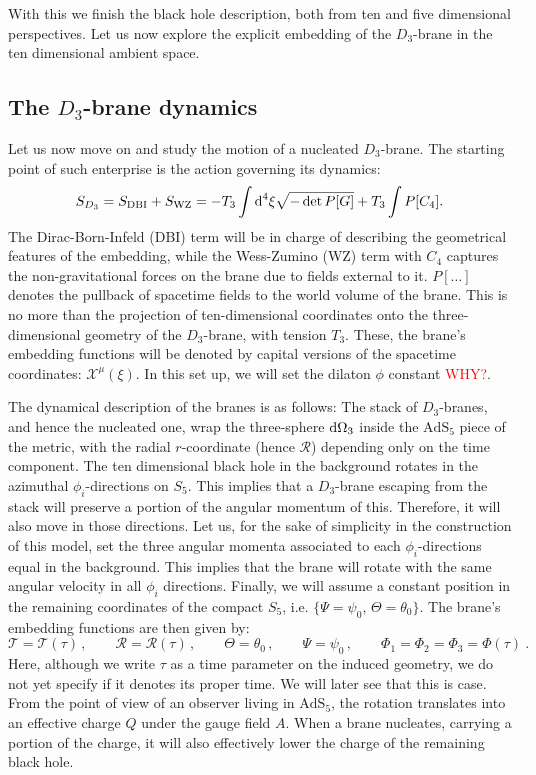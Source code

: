With this we finish the black hole description, both from ten and five dimensional perspectives. Let us now explore the explicit embedding of the $D_{3}$-brane in the ten dimensional ambient space.

\subsection{The $D_{3}$-brane dynamics}
Let us now move on and study the motion of a nucleated $D_{3}$-brane. The starting point of such enterprise is the action governing its dynamics:
\begin{equation}\label{eq: D3_action}
  S_{D_{3}} = S_{\text{DBI}} +S_{\text{WZ}} =  -T_3\int \text{d}^4\xi \sqrt{-\det P[G]}+T_3\int P[C_4].
\end{equation}
The Dirac-Born-Infeld (DBI) term will be in charge of describing the geometrical features of the embedding, while the Wess-Zumino (WZ) term with $C_4$ captures the non-gravitational forces on the brane due to fields external to it. $P[\dots]$ denotes the pullback of spacetime fields to the world volume of the brane. This is no more than the projection of ten-dimensional coordinates onto the three-dimensional geometry of the $D_{3}$-brane, with tension $T_{3}$. These, the brane's embedding functions will be denoted by capital versions of the spacetime coordinates: $\mathcal{X}^\mu(\xi)$. In this set up, we will set the dilaton $\phi$ constant \textcolor{red}{WHY?}.

The dynamical description of the branes is as follows: The stack of $D_{3}$-branes, and hence the nucleated one, wrap the three-sphere $\text{d} {\Omega_{3}}$ inside the $\text{AdS}_5$ piece of the metric, with the radial $r$-coordinate (hence $\mathcal{R}$) depending only on the time component. The ten dimensional black hole in the background rotates in the azimuthal $\phi_i$-directions on $S_{5}$. This implies that a $D_{3}$-brane escaping from the stack will preserve a portion of the angular momentum of this. Therefore, it will also move in those directions. Let us, for the sake of simplicity in the construction of this model, set the three angular momenta associated to each $\phi_i$-directions equal in the background. This implies that the brane will rotate with the same angular velocity in all $\phi_i$ directions. Finally, we will assume a constant position in the remaining coordinates of the compact $S_{5}$, i.e. $\{\Psi = \psi_{0}, \, \Theta = \theta_{0}\}$. The brane's embedding functions are then given by:
\begin{equation}
  \mathcal{T}=\mathcal{T}(\tau) \, , \qquad \mathcal{R}=\mathcal{R}(\tau) \, , \qquad \Theta = \theta_0 \, , \qquad \Psi = \psi_0 \, , \qquad \Phi_1 = \Phi_2 = \Phi_3 = \Phi(\tau) \ .
\end{equation}
Here, although we write $\tau$ as a time parameter on the induced geometry, we do not yet specify if it denotes its proper time. We will later see that this is case. From the point of view of an observer living in $\text{AdS}_5$, the rotation translates into an effective charge $Q$ under the gauge field $A$. When a brane nucleates, carrying a portion of the charge, it will also effectively lower the charge of the remaining black hole.

